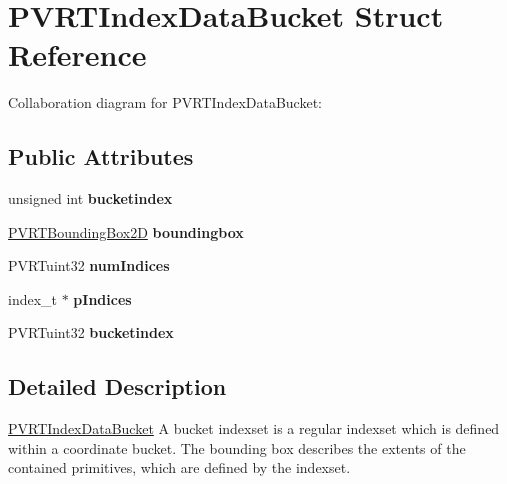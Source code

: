 \hypertarget{struct_p_v_r_t_index_data_bucket}{\section{P\+V\+R\+T\+Index\+Data\+Bucket Struct Reference}
\label{struct_p_v_r_t_index_data_bucket}
}


Collaboration diagram for P\+V\+R\+T\+Index\+Data\+Bucket\+:
\subsection*{Public Attributes}
\begin{DoxyCompactItemize}
\item 
\hypertarget{struct_p_v_r_t_index_data_bucket_a599d0402260b709437266c572ff53d3a}{unsigned int {\bfseries bucketindex}}\label{struct_p_v_r_t_index_data_bucket_a599d0402260b709437266c572ff53d3a}

\item 
\hypertarget{struct_p_v_r_t_index_data_bucket_a780faa346db004edad934f0c33e719e8}{\hyperlink{struct_p_v_r_t_bounding_box2_d}{P\+V\+R\+T\+Bounding\+Box2\+D} {\bfseries boundingbox}}\label{struct_p_v_r_t_index_data_bucket_a780faa346db004edad934f0c33e719e8}

\item 
\hypertarget{struct_p_v_r_t_index_data_bucket_abc0121ab6814e74756c770f75cf5a393}{P\+V\+R\+Tuint32 {\bfseries num\+Indices}}\label{struct_p_v_r_t_index_data_bucket_abc0121ab6814e74756c770f75cf5a393}

\item 
\hypertarget{struct_p_v_r_t_index_data_bucket_ace77a9906be942dbcb612bd5bf889a86}{index\+\_\+t $\ast$ {\bfseries p\+Indices}}\label{struct_p_v_r_t_index_data_bucket_ace77a9906be942dbcb612bd5bf889a86}

\item 
\hypertarget{struct_p_v_r_t_index_data_bucket_a599d0402260b709437266c572ff53d3a}{P\+V\+R\+Tuint32 {\bfseries bucketindex}}\label{struct_p_v_r_t_index_data_bucket_a599d0402260b709437266c572ff53d3a}

\end{DoxyCompactItemize}


\subsection{Detailed Description}


  \hyperlink{struct_p_v_r_t_index_data_bucket}{P\+V\+R\+T\+Index\+Data\+Bucket}  A bucket indexset is a regular indexset which is defined within a coordinate bucket. The bounding box describes the extents of the contained primitives, which are defined by the indexset. 

